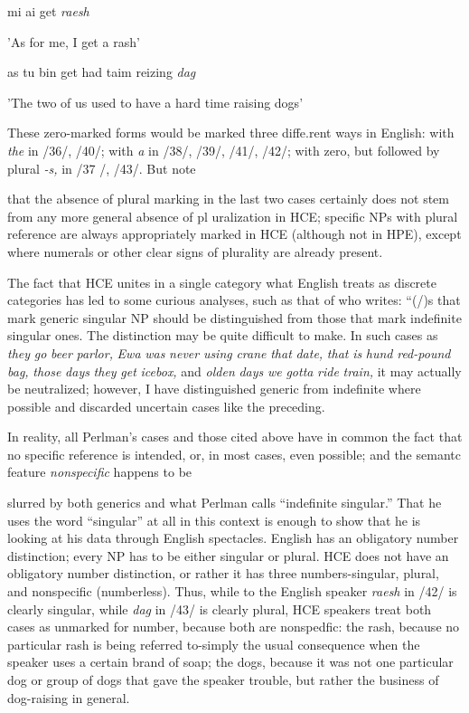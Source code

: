 \ea\label{ex:42}
 mi ai get \textit{raesh}
\glt
\z

'As for me, I get a rash'

\ea\label{ex:43}
 as tu bin get had taim reizing \textit{dag}
\glt
\z

'The two of us used to have a hard time raising dogs'

These zero-marked forms would be marked three diffe.rent ways in English: with \textit{the }in /36/, /40/; with \textit{a} in /38/, /39/, /41/, /42/; with zero, but followed by plural \textit{{}-s, }in /37 /, /43/. But note

that the absence of plural marking in the last two cases certainly does not stem from any more general absence of pl uralization in HCE; specific NPs with plural reference are always appropriately marked in HCE (although not in HPE), except where numerals or other clear signs of plurality are already present.

The fact that HCE unites in a single category what English treats as discrete categories has led to some curious analyses, such as that of \citet[99]{Perlman1973} who writes: ``(/)s that mark generic singular NP should be distinguished from those that mark indefinite singular ones. The distinction may be quite difficult to make. In such cases as \textit{they} \textit{go} \textit{beer} \textit{parlor,} \textit{Ewa} \textit{was} \textit{never} \textit{using} \textit{crane} \textit{that} \textit{date,} \textit{that} \textit{is} \textit{hund} \textit{red-pound} \textit{bag,} \textit{those }\textit{d}\textit{ays} \textit{they} \textit{get} \textit{icebox,} and \textit{olden} \textit{days} \textit{we} \textit{gotta} \textit{ride} \textit{train,} it may actually be neutralized; however, I have dis\-tinguished generic from indefinite where possible and discarded un\-certain cases like the preceding.{\textquotedbl}

In reality, all Perlman's cases and those cited above have in common the fact that no specific reference is intended, or, in most cases, even possible; and the semantc feature \textit{nonspecific} happens to be


slurred by both generics and what Perlman calls ``indefinite singular.'' That he uses the word ``singular'' at all in this context is enough to show that he is looking at his data through English spectacles. English has an obligatory number distinction; every NP has to be either singular or plural. HCE does not have an obligatory number distinction, or rather it has three numbers-singular, plural, and nonspecific (number\-less). Thus, while to the English speaker \textit{raesh} in /42/ is clearly singular, while \textit{d}\textit{ag} in /43/ is clearly plural, HCE speakers treat both cases as unmarked for number, because both are nonspedfic: the rash, because no particular rash is being referred to-simply the usual consequence when the speaker uses a certain brand of soap; the dogs, because it was not one particular dog or group of dogs that gave the speaker trouble, but rather the business of dog-raising in general.

